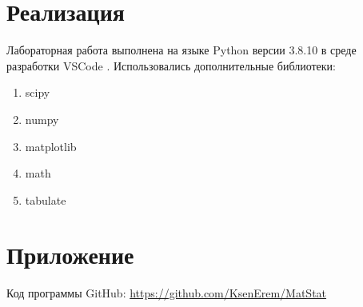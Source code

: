 \documentclass[a4paper]{article}
\begin{document}
\section {Реализация} 	
\noindent Лабораторная работа выполнена на языке Python версии 3.8.10 в среде разработки VSCode . Использовались дополнительные библиотеки:
\begin{enumerate}
    \item scipy
    \item numpy
    \item matplotlib
    \item math
    \item tabulate
\end{enumerate}

\section{Приложение}
\noindent Код программы GitHub: \url{https://github.com/KsenErem/MatStat}
\end{document}
